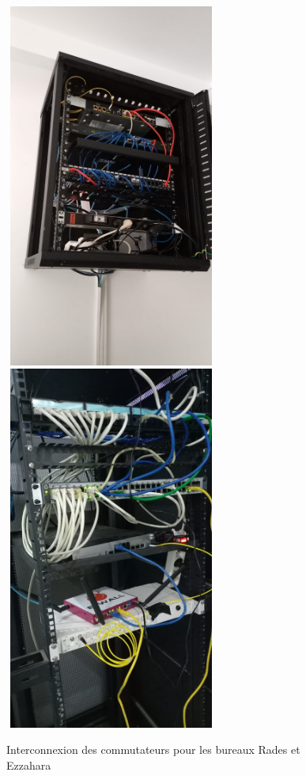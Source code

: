 \begin{figure}[H]
\centering
\includegraphics[width=7cm,height=12cm]{Images/BRades-ArmoirePrincipal.jpg} \includegraphics[width=7cm,height=12cm]{Images/Armoire-Ezzahara.jpg} 

\caption{Interconnexion des commutateurs pour les bureaux Rades et Ezzahara}
\label{Chap2.2.11}
\end{figure}




